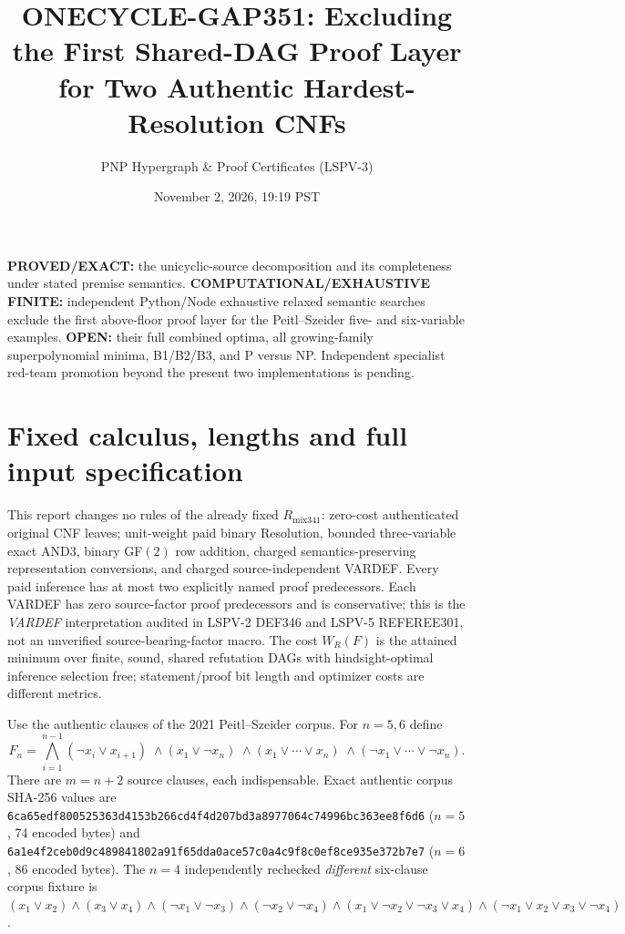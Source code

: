 \documentclass[11pt]{article}
\title{ONECYCLE-GAP351: Excluding the First Shared-DAG Proof Layer for Two Authentic Hardest-Resolution CNFs}
\author{PNP Hypergraph \& Proof Certificates (LSPV-3)}
\date{November 2, 2026, 19:19 PST}
\begin{document}
\maketitle
\noindent\textbf{PROVED/EXACT:} the unicyclic-source decomposition and its completeness under stated premise semantics. \textbf{COMPUTATIONAL/EXHAUSTIVE FINITE:} independent Python/Node exhaustive relaxed semantic searches exclude the first above-floor proof layer for the Peitl--Szeider five- and six-variable examples. \textbf{OPEN:} their full combined optima, all growing-family superpolynomial minima, B1/B2/B3, and P versus NP. Independent specialist red-team promotion beyond the present two implementations is pending.

\section*{Fixed calculus, lengths and full input specification}
This report changes no rules of the already fixed $R_{\mathrm{mix341}}$: zero-cost authenticated original CNF leaves; unit-weight paid binary Resolution, bounded three-variable exact AND3, binary GF$(2)$ row addition, charged semantics-preserving representation conversions, and charged source-independent VARDEF. Every paid inference has at most two explicitly named proof predecessors. Each VARDEF has zero source-factor proof predecessors and is conservative; this is the \emph{VARDEF} interpretation audited in LSPV-2 DEF346 and LSPV-5 REFEREE301, not an unverified source-bearing-factor macro. The cost $W_R(F)$ is the attained minimum over finite, sound, shared refutation DAGs with hindsight-optimal inference selection free; statement/proof bit length and optimizer costs are different metrics.

Use the authentic clauses of the 2021 Peitl--Szeider corpus. For $n=5,6$ define
\[
F_n=\bigwedge_{i=1}^{n-1}(\neg x_i\vee x_{i+1})
\;\wedge (x_1\vee\neg x_n)
\;\wedge (x_1\vee\cdots\vee x_n)
\;\wedge(\neg x_1\vee\cdots\vee\neg x_n).
\]
There are $m=n+2$ source clauses, each indispensable. Exact authentic corpus SHA-256 values are
\texttt{6ca65edf800525363d4153b266cd4f4d207bd3a8977064c74996bc363ee8f6d6} ($n=5$, 74 encoded bytes) and
\texttt{6a1e4f2ceb0d9c489841802a91f65dda0ace57c0a4c9f8c0ef8ce935e372b7e7} ($n=6$, 86 encoded bytes). The $n=4$ independently rechecked \emph{different} six-clause corpus fixture is
$(x_1\vee x_2)\wedge(x_3\vee x_4)\wedge(\neg x_1\vee\neg x_3)\wedge(\neg x_2\vee\neg x_4)
\wedge(x_1\vee\neg x_2\vee\neg x_3\vee x_4)\wedge(\neg x_1\vee x_2\vee x_3\vee\neg x_4)$.
\end{document}
